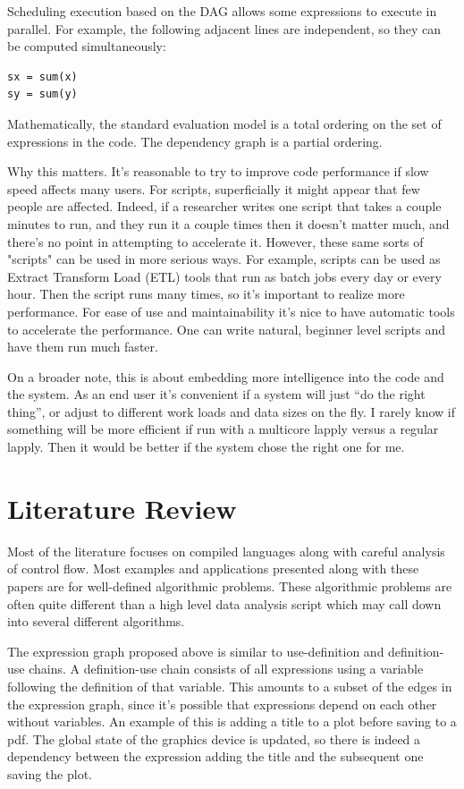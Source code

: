 \documentclass[12pt]{article}
\begin{document}
Scheduling execution based on the DAG allows some expressions to execute in
parallel. For example, the following adjacent lines are independent, so
they can be computed simultaneously:

\begin{verbatim}
sx = sum(x)
sy = sum(y)
\end{verbatim}

Mathematically, the standard evaluation model is a total ordering on the
set of expressions in the code. The dependency graph is a partial ordering.


Why this matters. It's reasonable to try to improve code performance if
slow speed affects many users. For scripts, superficially it might appear
that few people are affected. Indeed, if a researcher writes one script that
takes a couple minutes to run, and they run it a couple times then it
doesn't matter much, and there's no point in attempting to accelerate it.
However, these same sorts of "scripts" can be used in more serious ways.
For example, scripts can be used as Extract Transform Load (ETL) tools that
run as batch jobs every day or every hour. Then the script runs
many times, so it's important to realize more performance. For
ease of use and maintainability it's nice to have automatic tools to
accelerate the performance. One can write natural, beginner level scripts
and have them run much faster.

On a broader note, this is about embedding more intelligence into the code
and the system. As an end user it's convenient if a system will just ``do
the right thing'', or adjust to different work loads and data sizes on the
fly. I rarely know if something will be more efficient if
run with a multicore lapply versus a regular lapply. Then it would be
better if the system chose the right one for me.

\section{Literature Review}

Most of the literature focuses on compiled languages along with careful analysis
of control flow. Most examples and applications presented along with these
papers are for well-defined algorithmic problems. These algorithmic
problems are often quite different than a high level data analysis script
which may call down into several different algorithms.

The expression graph proposed above is similar to 
use-definition and definition-use chains. A definition-use chain consists
of all expressions using a variable following the definition of that
variable. This amounts to a subset of the edges in the expression graph,
since it's possible that expressions depend on each other without
variables. An example of this is adding a title to a plot before saving to
a pdf. The global state of the graphics device is updated, so there is
indeed a dependency between the expression adding the title and the
subsequent one saving the plot.
\end{document}
